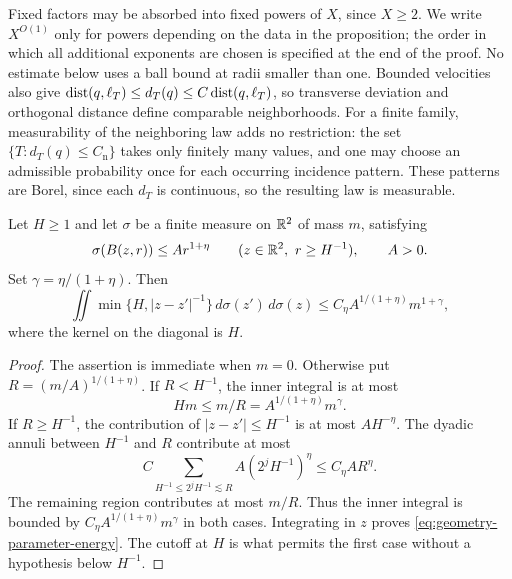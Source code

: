 Fixed factors may be absorbed into fixed powers of $X$, since $X\geq2$.
We write $X^{O(1)}$ only for powers depending on the data in the
proposition; the order in which all additional exponents are chosen
is specified at the end of the proof. No estimate below uses a ball
bound at radii smaller than one.
Bounded velocities also give
$\operatorname{dist}(q,\ell_T)\leq d_T(q)\leq C\operatorname{dist}(q,\ell_T)$, so transverse
deviation and orthogonal distance define comparable neighborhoods.
For a finite family, measurability of the neighboring law adds no
restriction: the set $\{T:d_T(q)\leq C_{\mathrm n}\}$ takes only
finitely many values, and one may choose an admissible probability
once for each occurring incidence pattern.
These patterns are Borel, since each $d_T$ is continuous, so the
resulting law is measurable.

\begin{lemma}\label{lem:geometry-energy}
Let $H\geq1$ and let $\sigma$ be a finite measure on $\mathbb R^2$ of mass
$m$, satisfying
\[
 \sigma(B(z,r))\leq A r^{1+\eta}
 \qquad(z\in\mathbb R^2,\ r\geq H^{-1}),\qquad A>0.
\]
Set $\gamma=\eta/(1+\eta)$. Then
\begin{equation}\label{eq:geometry-parameter-energy}
 \iint \min\{H,|z-z'|^{-1}\}\,d\sigma(z')\,d\sigma(z)
 \leq C_\eta A^{1/(1+\eta)}m^{1+\gamma},
\end{equation}
where the kernel on the diagonal is $H$.
\end{lemma}

\begin{proof}
The assertion is immediate when $m=0$. Otherwise put
$R=(m/A)^{1/(1+\eta)}$. If $R<H^{-1}$, the inner integral is at most
\[
 Hm\leq m/R=A^{1/(1+\eta)}m^\gamma.
\]
If $R\geq H^{-1}$, the contribution of $|z-z'|\leq H^{-1}$ is at
most $AH^{-\eta}$. The dyadic annuli between $H^{-1}$ and $R$
contribute at most
\[
 C\sum_{H^{-1}\leq 2^jH^{-1}\lesssim R}
       A(2^jH^{-1})^\eta
 \leq C_\eta AR^\eta.
\]
The remaining region contributes at most $m/R$. Thus the inner
integral is bounded by
$C_\eta A^{1/(1+\eta)}m^\gamma$ in both cases. Integrating in $z$
proves \eqref{eq:geometry-parameter-energy}. The cutoff at $H$ is
what permits the first case without a hypothesis below $H^{-1}$.
\end{proof}

